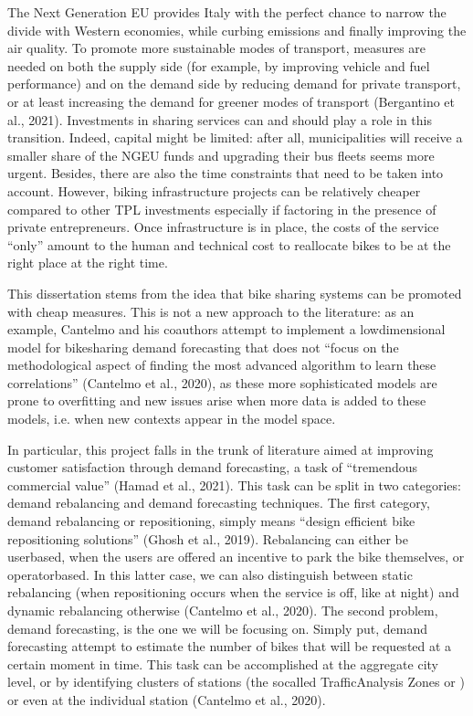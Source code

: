 \documentclass[letterpaper,10pt,english]{jupyterBook}
\begin{document}
\sphinxAtStartPar
The Next Generation EU provides Italy with the perfect chance to narrow the divide with Western economies, while curbing emissions and finally improving the air quality. To promote more sustainable modes of transport, measures are needed on both the supply side (for example, by improving vehicle and fuel performance) and on the demand side by reducing demand for private transport, or at least increasing the demand for greener modes of transport (Bergantino et al., 2021). Investments in sharing services can and should play a role in this transition. Indeed, capital might be limited: after all, municipalities will receive a smaller share of the NGEU funds and upgrading their bus fleets seems more urgent. Besides, there are also the time constraints that need to be taken into account. However, biking infrastructure projects can be relatively cheaper compared to other TPL investments \sphinxhyphen{} especially if factoring in the presence of private entrepreneurs. Once infrastructure is in place, the costs of the service “only” amount to the human and technical cost to reallocate bikes to be at the right place at the right time.

\sphinxAtStartPar
This dissertation stems from the idea that bike sharing systems can be promoted with cheap measures. This is not a new approach to the literature: as an example, Cantelmo and his coauthors attempt to implement a low\sphinxhyphen{}dimensional model for bike\sphinxhyphen{}sharing demand forecasting that does not “focus on the methodological aspect of finding the most advanced algorithm to learn these correlations” (Cantelmo et al., 2020), as these more sophisticated models are prone to overfitting and new issues arise when more data is added to these models, i.e. when new contexts appear in the model space.

\sphinxAtStartPar
In particular, this project falls in the trunk of literature aimed at improving customer satisfaction through demand forecasting, a task of “tremendous commercial value” (Hamad et al., 2021). This task can be split in two categories: demand rebalancing and demand forecasting techniques. The first category, demand rebalancing or repositioning, simply means “design efficient bike repositioning solutions” (Ghosh et al., 2019). Rebalancing can either be user\sphinxhyphen{}based, when the users are offered an incentive to park the bike themselves, or operator\sphinxhyphen{}based. In this latter case, we can also distinguish between static rebalancing (when repositioning occurs when the service is off, like at night) and dynamic rebalancing otherwise (Cantelmo et al., 2020). The second problem, demand forecasting, is the one we will be focusing on. Simply put, demand forecasting attempt to estimate the number of bikes that will be requested at a certain moment in time. This task can be accomplished at the aggregate city level, or by identifying clusters of stations (the so\sphinxhyphen{}called Traffic\sphinxhyphen{}Analysis Zones or ) or even at the individual station (Cantelmo et al., 2020).
\end{document}

